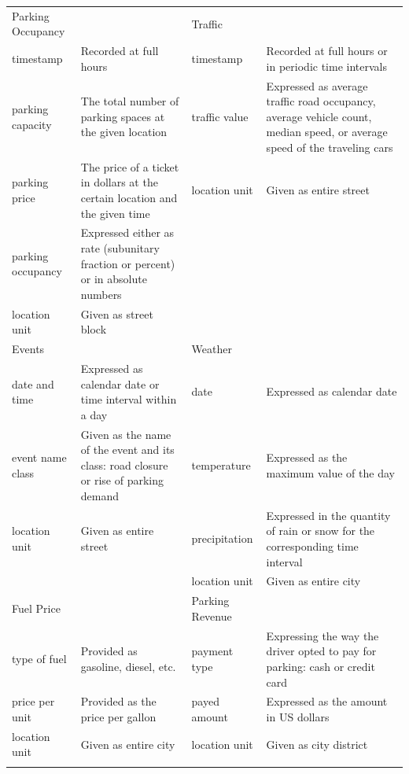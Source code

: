 	\begin{table}
		{\begin{tabular}{lp{4cm}lp{4cm}}	
				\toprule
				Parking Occupancy & & Traffic & \\
				\colrule
				timestamp & Recorded at full hours & timestamp & Recorded at full hours or in periodic time intervals \\
				parking capacity & The total number of parking spaces at the given location & traffic value & Expressed as average traffic road occupancy, average vehicle count, median speed, or average speed of the traveling cars \\
				parking price & The price of a ticket in dollars at the certain location and the given time & location unit & Given as entire street \\
				parking occupancy & Expressed either as rate (subunitary fraction or percent) or in absolute numbers & & \\
				location unit & Given as street block & & \\
				\colrule
				Events & & Weather & \\
				\colrule
				date and time & Expressed as calendar date or time interval within a day & date & Expressed as calendar date \\
				event name class & Given as the name of the event and its class: road closure or rise of parking demand & temperature & Expressed as the maximum value of the day \\
				location unit & Given as entire street & precipitation & Expressed in the quantity of rain or snow for the corresponding time interval \\
				& & location unit & Given as entire city \\
				\colrule
				Fuel Price & & Parking Revenue & \\
				\colrule
				type of fuel & Provided as gasoline, diesel, etc. & payment type & Expressing the way the driver opted to pay for parking: cash or credit card \\
				price per unit & Provided as the price per gallon & payed amount & Expressed as the amount in US dollars \\
				location unit & Given as entire city & location unit & Given as city district \\
				\botrule
		\end{tabular}}
		\label{tab:sfpark_data}
	\end{table}
		
